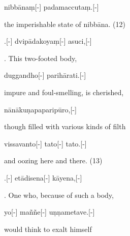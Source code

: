 \begin{samepage}
\begingl[glneveryline={\PaliGlossA,\PaliGlossB}]
nibbānaṃ[-] padamaccutaṃ.[-]
\endgl
\nopagebreak
\linespread{0.5}
\begin{spacin}{0.2}
{\PaliGlossFT the imperishable state of nibbāna. (12)}
\end{spacin}
\vskip 12pt
\end{samepage}
\vskip 0.2in
\begin{samepage}
.[-] dvipādakoyaṃ[-] asuci,[-]
\endgl
\nopagebreak
\linespread{0.5}
\begin{spacin}{0.2}
{. This two-footed body,}
\end{spacin}
\vskip 12pt
\end{samepage}
\begin{samepage}
\begingl[glneveryline={\PaliGlossA,\PaliGlossB}]
duggandho[-] parihārati.[-]
\endgl
\nopagebreak
\linespread{0.5}
\begin{spacin}{0.2}
{\PaliGlossFT impure and foul-smelling, is cherished,}
\end{spacin}
\vskip 12pt
\end{samepage}
\begin{samepage}
\begingl[glneveryline={\PaliGlossA,\PaliGlossB}]
nānākuṇapaparipūro,[-]
\endgl
\nopagebreak
\linespread{0.5}
\begin{spacin}{0.2}
{\PaliGlossFT though filled with various kinds of filth}
\end{spacin}
\vskip 12pt
\end{samepage}
\begin{samepage}
\begingl[glneveryline={\PaliGlossA,\PaliGlossB}]
vissavanto[-] tato[-] tato.[-]
\endgl
\nopagebreak
\linespread{0.5}
\begin{spacin}{0.2}
{\PaliGlossFT and oozing here and there. (13)}
\end{spacin}
\vskip 12pt
\end{samepage}
\vskip 0.2in
\begin{samepage}
.[-] etādisena[-] kāyena,[-]
\endgl
\nopagebreak
\linespread{0.5}
\begin{spacin}{0.2}
{. One who, because of such a body,}
\end{spacin}
\vskip 12pt
\end{samepage}
\begin{samepage}
\begingl[glneveryline={\PaliGlossA,\PaliGlossB}]
yo[-] maññe[-] uṇṇametave.[-]
\endgl
\nopagebreak
\linespread{0.5}
\begin{spacin}{0.2}
{\PaliGlossFT would think to exalt himself}
\end{spacin}
\vskip 12pt
\end{samepage}
